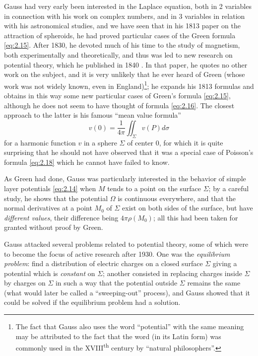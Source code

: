 \documentclass[12pt,a4paper,leqno,twoside]{extbook}
\newcommand{\supth}{\texorpdfstring{\textsuperscript{th}}{th}}
\begin{document}
Gauss had very early been interested in the Laplace equation, both in 2 variables in connection with his work on complex numbers, and in 3 variables in relation with his astronomical studies, and we have seen that in his 1813 paper on the attraction of spheroids, he had proved particular cases of the Green formula \eqref{eq:2.15}. After 1830, he devoted much of his time to the study of magnetism, both experimentally and theoretically, and thus was led to new research on potential theory, which he published in 1840 \cite[vol.~V, p.~197--242]{090}. In that paper, he quotes no other work on the subject, and it is very unlikely that he ever heard of Green (whose work was not widely known, even in England)\footnote{The fact that Gauss also uses the word ``potential'' with the same meaning may be attributed to the fact that the word (in its Latin form) was commonly used in the XVIII\supth{} century by ``natural philosophers''.}; he expands his 1813 formulas and obtains in this way some new particular cases of Green's formula \eqref{eq:2.15}, although he does not seem to have thought of formula \eqref{eq:2.16}. The closest approach to the latter is his famous ``mean value formula''
\begin{equation}
    \label{eq:2.20}
    v(0) = \frac{1}{4\pi} \iint_\Sigma v(P)d\sigma
\end{equation}
for a harmonic function \(v\) in a sphere \(\Sigma\) of center 0, for which it is quite surprising that he should not have observed that it was a special case of Poisson's formula \eqref{eq:2.18} which he cannot have failed to know.

As Green had done, Gauss was particularly interested in the behavior of simple layer potentials \eqref{eq:2.14} when \(M\) tends to a point on the surface \(\Sigma\); by a careful study, he shows that the potential \(\Omega\) is continuous everywhere, and that the normal derivatives at a point \(M_0\) of \(\Sigma\) exist on both sides of the surface, but have \emph{different values}, their difference being \(4\pi \rho(M_0)\); all this had been taken for granted without proof by Green.

Gauss attacked several problems related to potential theory, some of which were to become the focus of active research after 1930. One was the \emph{equilibrium problem}: find a distribution of electric charges on a closed surface \(\Sigma\) giving a potential which is \emph{constant} on \(\Sigma\); another consisted in replacing charges inside \(\Sigma\) by charges on \(\Sigma\) in such a way that the potential outside \(\Sigma\) remains the same (what would later be called a ``sweeping-out'' process), and Gauss showed that it could be solved if the equilibrium problem had a solution.
\end{document}
